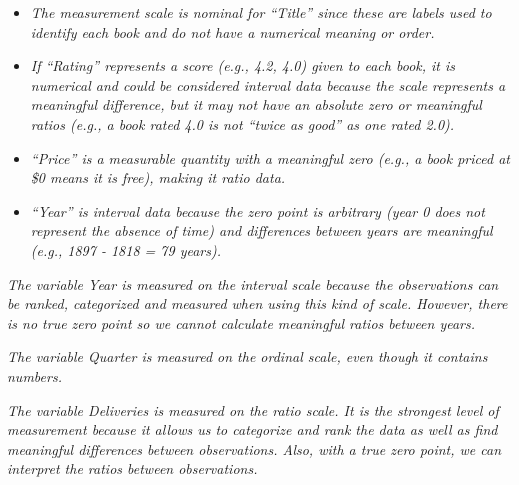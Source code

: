 \documentclass[
  11pt,
  letterpaper,
  DIV=11,
  numbers=noendperiod,
  oneside,
  open=any]{scrreprt}
\newenvironment{bsanswerkey}[2]{%
  \begin{tcolorbox}[bsbase, colback=bspaper2, colframe=bsline, fontupper=\small,
    title={\hypertarget{a-#1}{}\label{a-#1}\hyperlink{q-#1}{\textcolor{bsink2}{\MakeUppercase{#2}}}\hfill
      \hyperlink{q-#1}{\textcolor{bsaccent}{\normalfont\footnotesize back to page \pageref{q-#1}}}}]}%
  {\end{tcolorbox}}
\begin{document}
\begin{bsanswerkey}{bsans2}{Exercise 1, question 2}

\begin{itemize}
\item
  \emph{The measurement scale is nominal for ``Title'' since these are
  labels used to identify each book and do not have a numerical meaning
  or order.}
\item
  \emph{If ``Rating'' represents a score (e.g., 4.2, 4.0) given to each
  book, it is numerical and could be considered interval data because
  the scale represents a meaningful difference, but it may not have an
  absolute zero or meaningful ratios (e.g., a book rated 4.0 is not
  ``twice as good'' as one rated 2.0).}
\item
  \emph{``Price'' is a measurable quantity with a meaningful zero (e.g.,
  a book priced at \$0 means it is free), making it ratio data.}
\item
  \emph{``Year'' is interval data because the zero point is arbitrary
  (year 0 does not represent the absence of time) and differences
  between years are meaningful (e.g., 1897 - 1818 = 79 years).}
\end{itemize}

\end{bsanswerkey}

\begin{bsanswerkey}{bsans3}{Exercise 2, question 1}

\emph{The variable Year is measured on the interval scale because the
observations can be ranked, categorized and measured when using this
kind of scale. However, there is no true zero point so we cannot
calculate meaningful ratios between years.}

\end{bsanswerkey}

\begin{bsanswerkey}{bsans4}{Exercise 2, question 2}

\emph{The variable Quarter is measured on the ordinal scale, even though
it contains numbers.}

\end{bsanswerkey}

\begin{bsanswerkey}{bsans5}{Exercise 2, question 3}

\emph{The variable Deliveries is measured on the ratio scale. It is the
strongest level of measurement because it allows us to categorize and
rank the data as well as find meaningful differences between
observations. Also, with a true zero point, we can interpret the ratios
between observations.}

\end{bsanswerkey}
\end{document}

